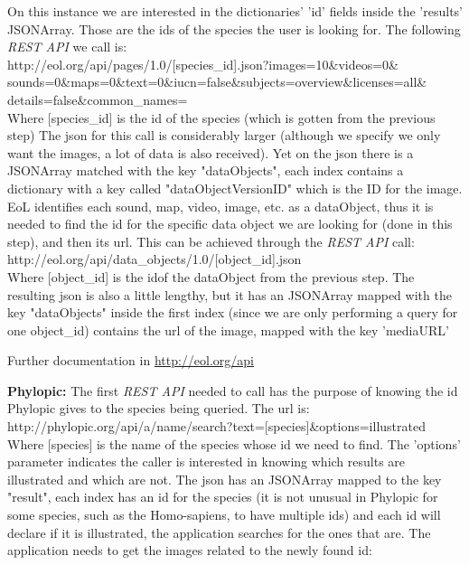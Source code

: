 \documentclass[10pt]{article}
\begin{document}
 On this instance we are interested in the dictionaries' 'id' fields inside the 'results' JSONArray. Those are the ids of the species the user is looking for. The following \textit{REST API} we call is:\\
 
http://eol.org/api/pages/1.0/[species\_id].json?images=10\&videos=0\&\\
sounds=0\&maps=0\&text=0\&iucn=false\&subjects=overview\&licenses=all\&\\
details=false\&common\_names= \\
 
Where [species\_id] is the id of the species (which is gotten from the previous step) The json for this call is considerably larger (although we specify we only want the images, a lot of data is also received). Yet on the json there is a JSONArray matched with the key "dataObjects", each index contains a dictionary with a key called "dataObjectVersionID" which is the ID for the image. EoL identifies each sound, map, video, image, etc. as a dataObject, thus it is needed to find the id for the specific data object we are looking for (done in this step), and then its url. This can be achieved through the \textit{REST API} call:\\

http://eol.org/api/data\_objects/1.0/[object\_id].json\\

Where [object\_id] is the idof the dataObject from the previous step. The resulting json is also a little lengthy, but it has an JSONArray mapped with the key "dataObjects" inside the first index (since we are only performing a query for one object\_id) contains the url of the image, mapped with the key 'mediaURL'

Further documentation in \href{http://eol.org/api}{http://eol.org/api}

\textbf{Phylopic:} The first \textit{REST API} needed to call has the purpose of knowing the id Phylopic gives to the species being queried. The url is:\\

http://phylopic.org/api/a/name/search?text=[species]\&options=illustrated\\

Where [species] is the name of the species whose id we need to find. The 'options' parameter indicates the caller is interested in knowing which results are illustrated and which are not. The json has an JSONArray mapped to the key "result", each index has an id for the species (it is not unusual in Phylopic for some species, such as the Homo-sapiens, to have multiple ids) and each id will declare if it is illustrated, the application searches for the ones that are. The application needs to get the images related to the newly found id:\\
\end{document}
